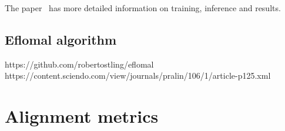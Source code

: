 The paper~\cite{dyer-etal-2013-simple} has more detailed information on training, inference and results.



\subsection{Eflomal algorithm}

https://github.com/robertostling/eflomal
https://content.sciendo.com/view/journals/pralin/106/1/article-p125.xml

\section{Alignment metrics}\label{tra:metrics}